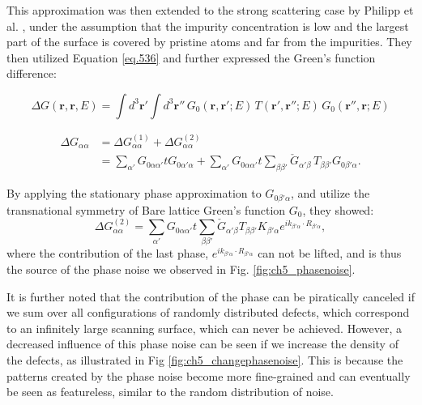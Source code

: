 This approximation was then extended to the strong scattering case by Philipp et al. \cite{russmannInitioTheoryFourierTransformed2021}, under the assumption that the impurity concentration is low and the largest part of the surface is covered by pristine atoms and far from the impurities. They then utilized Equation \ref{eq.536} and further expressed the Green's function difference:

\[
\Delta G(\mathbf{r}, \mathbf{r}, E) = \int d^3 \mathbf{r}' \int d^3 \mathbf{r}'' \, G_0(\mathbf{r}, \mathbf{r}'; E) \, T(\mathbf{r}', \mathbf{r}''; E) \, G_0(\mathbf{r}'', \mathbf{r}; E)
\]

\begin{align}
	\label{eq.537}
	\Delta G_{\alpha \alpha} &= \Delta G^{(1)}_{\alpha \alpha} + \Delta G^{(2)}_{\alpha \alpha} \\
	\label{eq.538}
	&= \sum_{\alpha'} G_{0\alpha \alpha'} t G_{0\alpha' \alpha} + \sum_{\alpha'} G_{0\alpha \alpha'} t\sum_{\beta \beta'} \check{G}_{\alpha' \beta} \, T_{\beta \beta'} G_{0\beta' \alpha}.
\end{align}

\noindent By applying the stationary phase approximation \cite{lounisTheoryRealSpace2011} to $G_{0\beta'\alpha}$, and utilize the transnational symmetry of Bare lattice Green's function $G_0$, they showed:
\[
\Delta G^{(2)}_{\alpha\alpha}=\sum_{\alpha'}G_{0\alpha\alpha'}t\sum_{\beta\beta'}\check{G}_{\alpha'\beta}T_{\beta\beta'}K_{\beta'\alpha}e^{ik_{\beta'\alpha}\cdot R_{\beta'\alpha}},
\]
\noindent where the contribution of the last phase, $e^{ik_{\beta'\alpha}\cdot R_{\beta'\alpha}}$ can not be lifted, and is thus the source of the phase noise we observed in Fig. \ref{fig:ch5_phasenoise}. 

It is further noted that the contribution of the phase can be piratically canceled if we sum over all configurations of randomly distributed defects, which correspond to an infinitely large scanning surface, which can never be achieved. However, a decreased influence of this phase noise can be seen if we increase the density of the defects, as illustrated in Fig \ref{fig:ch5_changephasenoise}. This is because the patterns created by the phase noise become more fine-grained and can eventually be seen as featureless, similar to the random distribution of noise.  

